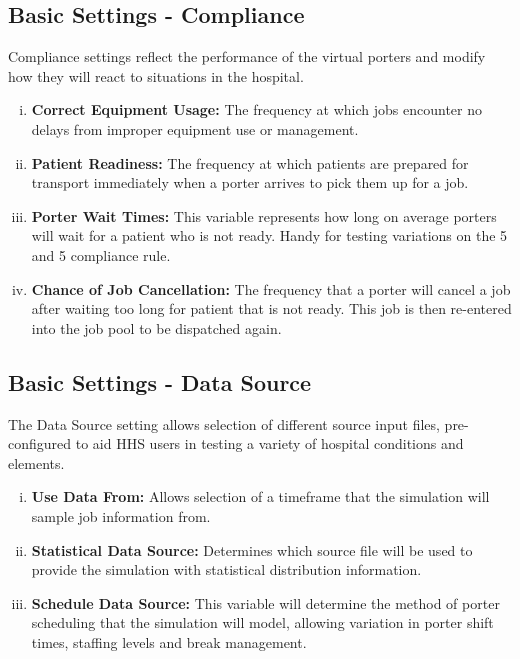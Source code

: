\documentclass[paper=letter, fontsize=10pt]{scrartcl}
\numberwithin{equation}{section}		%
\numberwithin{figure}{section}			%
\numberwithin{table}{section}				%
\begin{document}
	\subsection{Basic Settings - Compliance}
	Compliance settings reflect the performance of the virtual porters and modify how they will react to situations in the hospital.
	\begin{enumerate}[(i)]
		\item \textbf{Correct Equipment Usage:} The frequency at which jobs encounter no delays from improper equipment use or management.
		\item \textbf{Patient Readiness:} The frequency at which patients are prepared for transport immediately when a porter arrives to pick them up for a job.
		\item \textbf{Porter Wait Times:} This variable represents how long on average porters will wait for a patient who is not ready. Handy for testing variations on the 5 and 5 compliance rule.
		\item \textbf{Chance of Job Cancellation:} The frequency that a porter will cancel a job after waiting too long for patient that is not ready. This job is then re-entered into the job pool to be dispatched again.
	\end{enumerate}
	
	\subsection{Basic Settings - Data Source}
	The Data Source setting allows selection of different source input files, pre-configured to aid HHS users in testing a variety of hospital conditions and elements. 
	\begin{enumerate}[(i)]
		\item \textbf{Use Data From:} Allows selection of a timeframe that the simulation will sample job information from.
		\item \textbf{Statistical Data Source:} Determines which source file will be used to provide the simulation with statistical distribution information. 
		\item \textbf{Schedule Data Source:} This variable will determine the method of porter scheduling that the simulation will model, allowing variation in porter shift times, staffing levels and break management.
	\end{enumerate}
	
\end{document}
